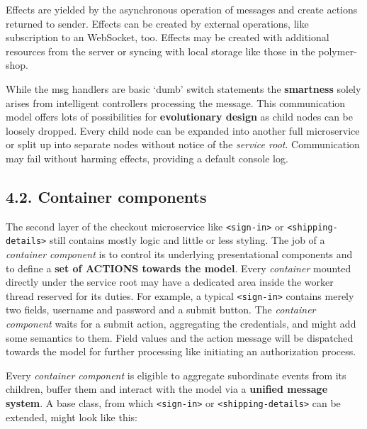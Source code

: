 \documentclass[]{article}
\begin{document}
Effects are yielded by the asynchronous operation of messages and create
actions returned to sender. Effects can be created by external
operations, like subscription to an WebSocket, too. Effects may be
created with additional resources from the server or syncing with local
storage like those in the polymer-shop.

While the msg handlers are basic `dumb' switch statements the
\textbf{smartness} solely arises from intelligent controllers processing
the message. This communication model offers lots of possibilities for
\textbf{evolutionary design} as child nodes can be loosely dropped.
Every child node can be expanded into another full microservice or split
up into separate nodes without notice of the \emph{service root}.
Communication may fail without harming effects, providing a default
console log.

\subsection{4.2. Container components}\label{container-components}

The second layer of the checkout microservice like
\texttt{\textless{}sign-in\textgreater{}} or
\texttt{\textless{}shipping-details\textgreater{}} still contains mostly
logic and little or less styling. The job of a \emph{container
component} is to control its underlying presentational components and to
define a \textbf{set of ACTIONS towards the model}. Every
\emph{container} mounted directly under the service root may have a
dedicated area inside the worker thread reserved for its duties. For
example, a typical \texttt{\textless{}sign-in\textgreater{}} contains
merely two fields, username and password and a submit button. The
\emph{container component} waits for a submit action, aggregating the
credentials, and might add some semantics to them. Field values and the
action message will be dispatched towards the model for further
processing like initiating an authorization process.

Every \emph{container component} is eligible to aggregate subordinate
events from its children, buffer them and interact with the model via a
\textbf{unified message system}. A base class, from which
\texttt{\textless{}sign-in\textgreater{}} or
\texttt{\textless{}shipping-details\textgreater{}} can be extended,
might look like this:
\end{document}
